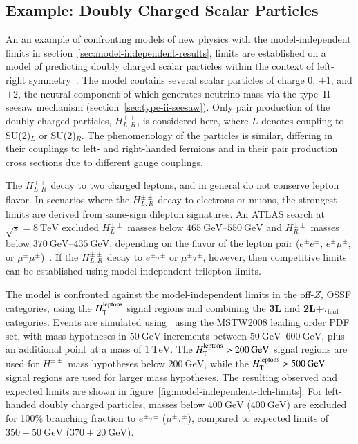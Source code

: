 \subsection{Example: Doubly Charged Scalar Particles}
An an example of confronting models of new physics with the model-independent limits in section~\ref{sec:model-independent-results}, limits are established on a model of predicting doubly charged scalar particles within the context of left-right symmetry~\cite{Pati:1974yy,Mohapatra:1974hk,Senjanovic:1975rk,Rizzo:1981xx}. The model contains several scalar particles of charge 0, $\pm1$, and $\pm2$, the neutral component of which generates neutrino mass via the type~II seesaw mechanism (section~\ref{sec:type-ii-seesaw}). Only pair production of the doubly charged particles, $H^{\pm\pm}_{L,R}$, is considered here, where $L$ denotes coupling to SU(2)$_L$ or SU(2)$_R$. The phenomenology of the particles is similar, differing in their couplings to left- and right-handed fermions and in their pair production cross sections due to different gauge couplings. 

The $H^{\pm\pm}_{L,R}$ decay to two charged leptons, and in general do not conserve lepton flavor. In scenarios where the $H^{\pm\pm}_{L,R}$ decay to electrons or muons, the strongest limits are derived from same-sign dilepton signatures. An ATLAS search at $\sqrt{s}=\SI{8}{\tera\electronvolt}$ excluded $H^{\pm\pm}_L$ masses below $\SIrange[range-phrase=-]{465}{550}{\giga\electronvolt}$ and $H^{\pm\pm}_R$ masses below $\SIrange[range-phrase=-]{370}{435}{\giga\electronvolt}$, depending on the flavor of the lepton pair ($e^{\pm}e^{\pm}$, $e^{\pm}\mu^{\pm}$, or $\mu^{\pm}\mu^{\pm}$)~\cite{TheATLASCollaboration:2015gu}. If the $H^{\pm\pm}_{L,R}$ decay to $e^{\pm}\tau^{\pm}$ or $\mu^{\pm}\tau^{\pm}$, however, then competitive limits can be established using model-independent trilepton limits. 

The model is confronted against the model-independent limits in the off-$Z$, OSSF categories, using the $H_{\mathrm{T}}^{\mathrm{leptons}}$ signal regions and combining the \textbf{3L} and \textbf{2L$+\tau_{\mathrm{had}}$} categories. Events are simulated using \ using the MSTW2008 leading order PDF set, with mass hypotheses in $\SI{50}{\giga\electronvolt}$ increments between $\SIrange[range-phrase=-]{50}{600}{\giga\electronvolt}$, plus an additional point at a mass of $\SI{1}{\tera\electronvolt}$. The $H_{\mathrm{T}}^{\mathrm{leptons}}>\SI{200}{\giga\electronvolt}$ signal regions are used for $H^{\pm\pm}$ mass hypotheses below $\SI{200}{\giga\electronvolt}$, while the $H_{\mathrm{T}}^{\mathrm{leptons}}>\SI{500}{\giga\electronvolt}$ signal regions are used for larger mass hypotheses. The resulting observed and expected limits are shown in figure~\ref{fig:model-independent-dch-limits}. For left-handed doubly charged particles, masses below $\SI{400}{\giga\electronvolt}$ ($\SI{400}{\giga\electronvolt}$) are excluded for 100\% branching fraction to $e^{\pm}\tau^{\pm}$ ($\mu^{\pm}\tau^{\pm}$), compared to expected limits of $350\pm\SI{50}{\giga\electronvolt}$ ($370\pm\SI{20}{\giga\electronvolt}$). 

